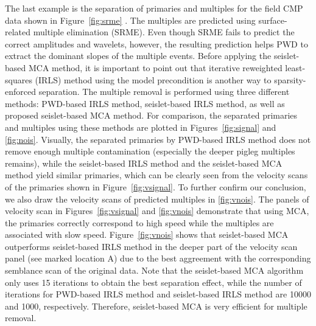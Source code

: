 The last example is the separation of primaries and multiples for the field CMP data shown in Figure~\ref{fig:srme} \citep{fomel2006regularizing}. The multiples are predicted using surface-related multiple elimination (SRME). Even though SRME fails to predict the correct amplitudes and wavelets, however, the resulting prediction helps PWD to extract the dominant slopes of the multiple events. 
Before applying the seislet-based MCA method, it is important to point out that iterative reweighted least-squares (IRLS) method using the model precondition is another way to sparsity-enforced separation. The multiple removal is performed using three different methods: PWD-based IRLS method, seislet-based IRLS method, as well as proposed seislet-based MCA method. For comparison, the separated primaries and multiples using these methods are plotted in Figures~\ref{fig:signal} and \ref{fig:nois}. Visually, the separated primaries by PWD-based IRLS method does not remove enough multiple contamination (especially the deeper pigleg multiples remains), while the seislet-based IRLS method and the seislet-based MCA method yield similar primaries, which can be clearly seen from the velocity scans of the primaries shown in Figure~\ref{fig:vsignal}. To further confirm our conclusion, we also draw the velocity scans of predicted multiples in \ref{fig:vnois}. The panels of velocity scan in Figures~\ref{fig:vsignal} and \ref{fig:vnois} demonstrate that using MCA, the primaries correctly correspond to high speed while the multiples are associated with slow speed. Figure~\ref{fig:vnois} shows that seislet-based MCA outperforms seislet-based IRLS method
in the deeper part of the velocity scan panel (see marked location A) due to the best aggreement with the corresponding semblance scan of the original data. Note that the seislet-based MCA algorithm only uses 15 iterations to obtain the best separation effect, while the number of iterations for PWD-based IRLS method and seislet-based IRLS method are 10000 and 1000, respectively. Therefore, seislet-based MCA is very efficient for multiple removal.



